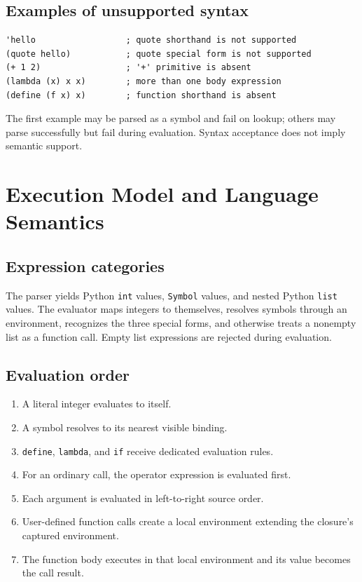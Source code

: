 \documentclass[11pt,a4paper,oneside]{report}
\begin{document}
\section{Examples of unsupported syntax}
\begin{lstlisting}
'hello                  ; quote shorthand is not supported
(quote hello)           ; quote special form is not supported
(+ 1 2)                 ; '+' primitive is absent
(lambda (x) x x)        ; more than one body expression
(define (f x) x)        ; function shorthand is absent
\end{lstlisting}
The first example may be parsed as a symbol and fail on lookup; others may parse successfully but fail during evaluation. Syntax acceptance does not imply semantic support.

\chapter{Execution Model and Language Semantics}
\section{Expression categories}
The parser yields Python \texttt{int} values, \texttt{Symbol} values, and nested Python \texttt{list} values. The evaluator maps integers to themselves, resolves symbols through an environment, recognizes the three special forms, and otherwise treats a nonempty list as a function call. Empty list expressions are rejected during evaluation.
\section{Evaluation order}
\begin{enumerate}[leftmargin=*]
\item A literal integer evaluates to itself.
\item A symbol resolves to its nearest visible binding.
\item \texttt{define}, \texttt{lambda}, and \texttt{if} receive dedicated evaluation rules.
\item For an ordinary call, the operator expression is evaluated first.
\item Each argument is evaluated in left-to-right source order.
\item User-defined function calls create a local environment extending the closure's captured environment.
\item The function body executes in that local environment and its value becomes the call result.
\end{enumerate}
\end{document}
